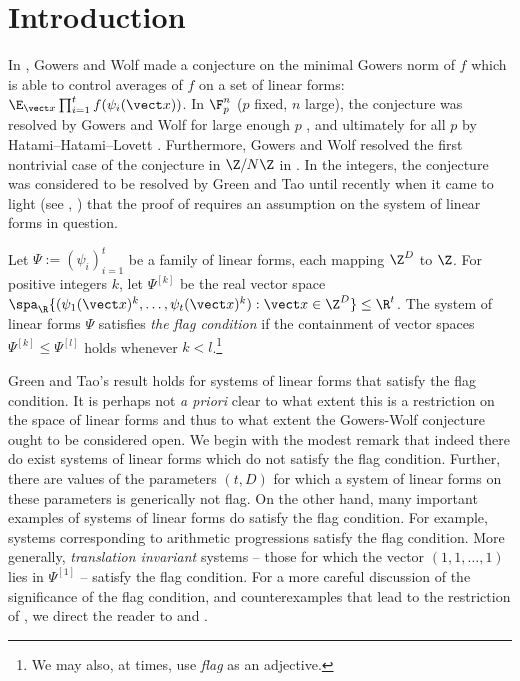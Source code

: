 \section{Introduction}\label{s:intro}
In \cite[Conjecture 2.5]{GW10}, Gowers and Wolf made a conjecture on the minimal Gowers norm of $f$ which is able to control averages of $f$ on a set of linear forms: $\E_{\vect x} \prod_{i=1}^t f(\psi_i(\vect x))$. In $\F_p^n$ ($p$ fixed, $n$ large), the conjecture was resolved by Gowers and Wolf for large enough $p$ \cite{GW10, GW11quad, GW11high} , and ultimately for all $p$ by Hatami--Hatami--Lovett \cite{HHL16}. Furthermore, Gowers and Wolf resolved the first nontrivial case of the conjecture in $\Z/N\Z$ in \cite{GW11cyc}. In the integers, the conjecture was considered to be resolved by Green and Tao until recently when it came to light (see \cite{GT20}, \cite{T20}) that the proof of \cite[Theorem 1.13]{GT10} requires an assumption on the system of linear forms in question.

Let $\Psi:=(\psi_i)_{i=1}^t$ be a family of linear forms, each mapping $\Z^D$ to $\Z$. For positive integers $k$, let $\Psi^{[k]}$ be the real vector space $\spa_{\R}\{(\psi_1(\vect x)^k, \ldots, \psi_t(\vect x)^k):\vect x \in \Z^D\} \leq \R^t$. The system of linear forms $\Psi$ satisfies \textit{the flag condition} if the containment of vector spaces $\Psi^{[k]} \leq \Psi^{[l]}$ holds whenever $k < l$.\footnote{We may also, at times, use \textit{flag} as an adjective.} 

Green and Tao's result \cite[Theorem 1.13]{GT10} holds for systems of linear forms that satisfy the flag condition. It is perhaps not \textit{a priori} clear to what extent this is a restriction on the space of linear forms and thus to what extent the Gowers-Wolf conjecture ought to be considered open. We begin with the modest remark that indeed there do exist systems of linear forms which do not satisfy the flag condition. Further, there are values of the parameters $(t,D)$ for which a system of linear forms on these parameters is generically not flag. On the other hand, many important examples of systems of linear forms do satisfy the flag condition. For example, systems corresponding to arithmetic progressions satisfy the flag condition. More generally, \textit{translation invariant} systems -- those for which the vector $(1,1,\ldots, 1)$ lies in  $\Psi^{[1]}$ -- satisfy the flag condition. For a more careful discussion of the significance of the flag condition, and counterexamples that lead to the restriction of \cite[Theorem 1.13]{GT10}, we direct the reader to \cite{GT20} and \cite{T20}.

